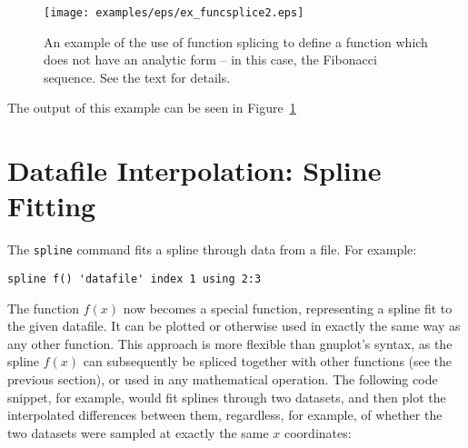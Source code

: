 \begin{figure}
\begin{center}
\texttt{[image: examples/eps/ex\_funcsplice2.eps]}
\end{center}
\caption{An example of the use of function splicing to define a function which does not have an analytic form -- in this case, the Fibonacci sequence. See the text for details.}
\label{fig:ex_funcsplice2}
\end{figure}

\noindent The output of this example can be seen in Figure~\ref{fig:ex_funcsplice2}

\section{Datafile Interpolation: Spline Fitting}
\label{spline_command}

%
%
The \texttt{spline} command fits a
spline through data from a file.  For example:

\begin{verbatim}
spline f() 'datafile' index 1 using 2:3
\end{verbatim}

The function $f(x)$ now becomes a special function, representing a spline fit
to the given datafile. It can be plotted or otherwise used in exactly the same
way as any other function. This approach is more flexible than gnuplot's
syntax, as the spline $f(x)$ can subsequently be spliced together with other
functions (see the previous section), or used in any mathematical operation.
The following code snippet, for example, would fit splines through two
datasets, and then plot the interpolated differences between them, regardless,
for example, of whether the two datasets were sampled at exactly the same $x$
coordinates:

